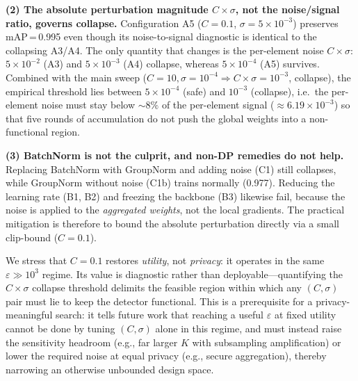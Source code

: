 \documentclass[conference]{IEEEtran}
\begin{document}
\textbf{(2) The absolute perturbation magnitude $C\!\times\!\sigma$, not the
noise/signal ratio, governs collapse.} Configuration A5 ($C{=}0.1$,
$\sigma{=}5{\times}10^{-3}$) preserves mAP\,=\,0.995 even though its
noise-to-signal diagnostic is identical to the collapsing A3/A4. The only
quantity that changes is the per-element noise $C\!\times\!\sigma$:
$5{\times}10^{-2}$ (A3) and $5{\times}10^{-3}$ (A4) collapse, whereas
$5{\times}10^{-4}$ (A5) survives. Combined with the main sweep
($C{=}10,\sigma{=}10^{-4}\!\Rightarrow\!C\!\times\!\sigma{=}10^{-3}$, collapse),
the empirical threshold lies between $5{\times}10^{-4}$ (safe) and
$10^{-3}$ (collapse), i.e.\ the per-element noise must stay below
$\sim\!8\%$ of the per-element signal ($\approx 6.19\times10^{-3}$) so that
five rounds of accumulation do not push the global weights into a
non-functional region.

\textbf{(3) BatchNorm is not the culprit, and non-DP remedies do not help.}
Replacing BatchNorm with GroupNorm and adding noise (C1) still collapses, while
GroupNorm without noise (C1b) trains normally (0.977). Reducing the learning
rate (B1, B2) and freezing the backbone (B3) likewise fail, because the noise
is applied to the \emph{aggregated weights}, not the local gradients. The
practical mitigation is therefore to bound the absolute perturbation directly
via a small clip-bound ($C{=}0.1$).

We stress that $C{=}0.1$ restores \emph{utility}, not \emph{privacy}: it
operates in the same $\varepsilon\gg10^{3}$ regime. Its value is diagnostic
rather than deployable---quantifying the $C\!\times\!\sigma$ collapse threshold
delimits the feasible region within which any $(C,\sigma)$ pair must lie to keep
the detector functional. This is a prerequisite for a privacy-meaningful search:
it tells future work that reaching a useful $\varepsilon$ at fixed utility
cannot be done by tuning $(C,\sigma)$ alone in this regime, and must instead
raise the sensitivity headroom (e.g., far larger $K$ with subsampling
amplification) or lower the required noise at equal privacy (e.g., secure
aggregation), thereby narrowing an otherwise unbounded design space.
\end{document}
